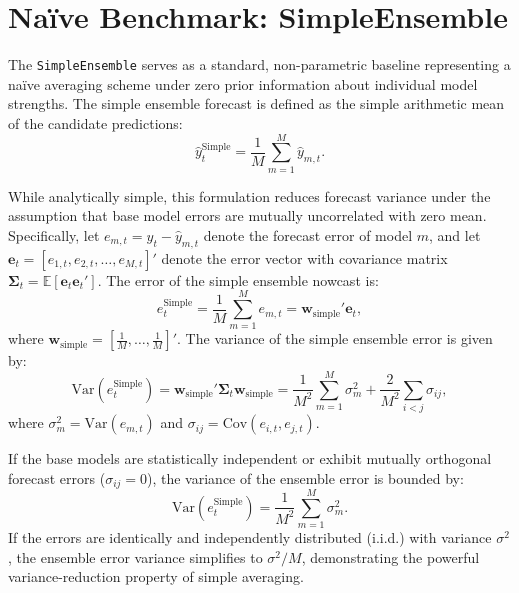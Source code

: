 \documentclass[12pt,a4paper]{article}
\begin{document}
\section{Na\"ive Benchmark: SimpleEnsemble}

The \texttt{SimpleEnsemble} serves as a standard, non-parametric baseline representing a na\"ive averaging scheme under zero prior information about individual model strengths. The simple ensemble forecast is defined as the simple arithmetic mean of the candidate predictions:
\begin{equation}
    \hat{y}_{t}^{\text{Simple}} = \frac{1}{M}\sum_{m=1}^{M} \hat{y}_{m,t}.
\end{equation}

While analytically simple, this formulation reduces forecast variance under the assumption that base model errors are mutually uncorrelated with zero mean. Specifically, let $e_{m,t} = y_t - \hat{y}_{m,t}$ denote the forecast error of model $m$, and let $\bm{e}_t = [e_{1,t}, e_{2,t}, \dots, e_{M,t}]'$ denote the error vector with covariance matrix $\bm{\Sigma}_t = \mathbb{E}[\bm{e}_t \bm{e}_t']$. The error of the simple ensemble nowcast is:
\begin{equation}
    e_{t}^{\text{Simple}} = \frac{1}{M}\sum_{m=1}^{M} e_{m,t} = \mathbf{w}_{\text{simple}}' \bm{e}_t,
\end{equation}
where $\mathbf{w}_{\text{simple}} = [\frac{1}{M}, \dots, \frac{1}{M}]'$. The variance of the simple ensemble error is given by:
\begin{equation}
    \text{Var}(e_{t}^{\text{Simple}}) = \mathbf{w}_{\text{simple}}' \bm{\Sigma}_t \mathbf{w}_{\text{simple}} = \frac{1}{M^2}\sum_{m=1}^{M} \sigma_m^2 + \frac{2}{M^2}\sum_{i < j} \sigma_{ij},
\end{equation}
where $\sigma_m^2 = \text{Var}(e_{m,t})$ and $\sigma_{ij} = \text{Cov}(e_{i,t}, e_{j,t})$. 

If the base models are statistically independent or exhibit mutually orthogonal forecast errors ($\sigma_{ij} = 0$), the variance of the ensemble error is bounded by:
\begin{equation}
    \text{Var}(e_{t}^{\text{Simple}}) = \frac{1}{M^2}\sum_{m=1}^{M}\sigma_m^2.
\end{equation}
If the errors are identically and independently distributed (i.i.d.) with variance $\sigma^2$, the ensemble error variance simplifies to $\sigma^2 / M$, demonstrating the powerful variance-reduction property of simple averaging. 
\end{document}
